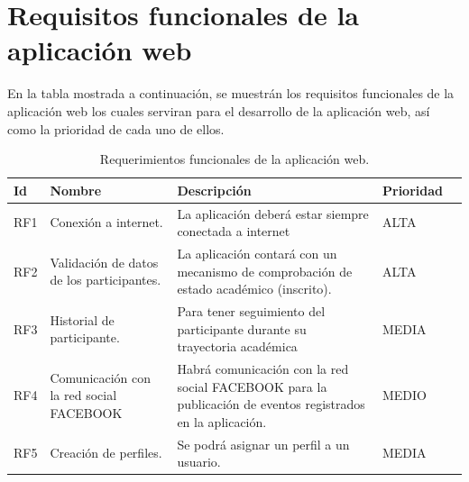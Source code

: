 \section{Requisitos funcionales de la aplicación web}
En la tabla mostrada a continuación, se muestrán los requisitos funcionales de la aplicación web los cuales serviran para el desarrollo de la aplicación web, así como la prioridad de cada uno de ellos.
\begin{table}[htbp]
	\begin{center}
		\begin{tabular}{|l|p{45mm}|p{45mm}|p{45mm}|l}
			\hline
			Id & Nombre & Descripción & Prioridad \\
			\hline 
			RF1 & Conexión a internet. & La aplicación deberá estar siempre conectada a internet & ALTA \\ \hline
			RF2 & Validación de datos de los participantes. & La aplicación contará con un mecanismo de comprobación de estado académico (inscrito). & ALTA \\ \hline
			RF3 & Historial de participante. & Para tener seguimiento del participante durante su trayectoria académica & MEDIA  \\ \hline
			RF4 & Comunicación con la red social FACEBOOK &Habrá comunicación con la red social FACEBOOK para la publicación de eventos registrados en la aplicación.  & MEDIO \\ \hline
			RF5 & Creación de perfiles. & Se podrá asignar un perfil a un usuario.& MEDIA \\ \hline
		\end{tabular}
		\pagebreak
		\caption{Requerimientos funcionales de la aplicación web.}
		\label{tabla:sencilla}
	\end{center}
\end{table}


